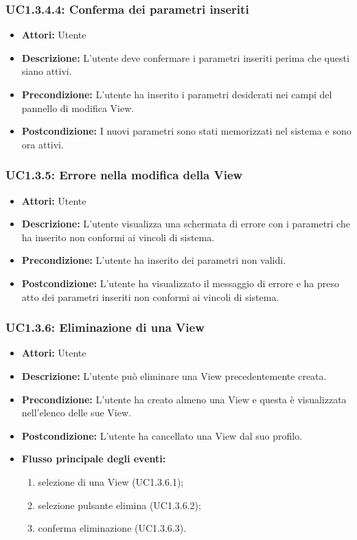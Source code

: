 \subsubsection{UC1.3.4.4: Conferma dei parametri inseriti}

\begin{itemize}
    \item \textbf{Attori:} Utente
    \item \textbf{Descrizione:} L'utente deve confermare i parametri inseriti perima che questi siano attivi.
    \item \textbf{Precondizione:} L'utente ha inserito i parametri desiderati nei campi del pannello di modifica View.
    \item \textbf{Postcondizione:} I nuovi parametri sono stati memorizzati nel sistema e sono ora attivi.
\end{itemize}

\subsubsection{UC1.3.5: Errore nella modifica della View}

\begin{itemize}
    \item \textbf{Attori:} Utente
    \item \textbf{Descrizione:} L'utente visualizza una schermata di errore con i parametri che ha inserito non conformi ai vincoli di sistema.
    \item \textbf{Precondizione:} L'utente ha inserito dei parametri non validi.
    \item \textbf{Postcondizione:} L'utente ha visualizzato il messaggio di errore e ha preso atto dei parametri inseriti non conformi ai vincoli di sistema.
\end{itemize}

\subsubsection{UC1.3.6: Eliminazione di una View}

\begin{itemize}
    \item \textbf{Attori:} Utente
    \item \textbf{Descrizione:} L'utente può eliminare una View precedentemente creata.
    \item \textbf{Precondizione:} L'utente ha creato almeno una View e questa è visualizzata nell'elenco delle sue View.
    \item \textbf{Postcondizione:} L'utente ha cancellato una View dal suo profilo.
    \item \textbf{Flusso principale degli eventi:}

    \begin{enumerate}
        \item selezione di una View (UC1.3.6.1);
        \item selezione pulsante elimina (UC1.3.6.2);
        \item conferma eliminazione (UC1.3.6.3).
    \end{enumerate}

\end{itemize}

